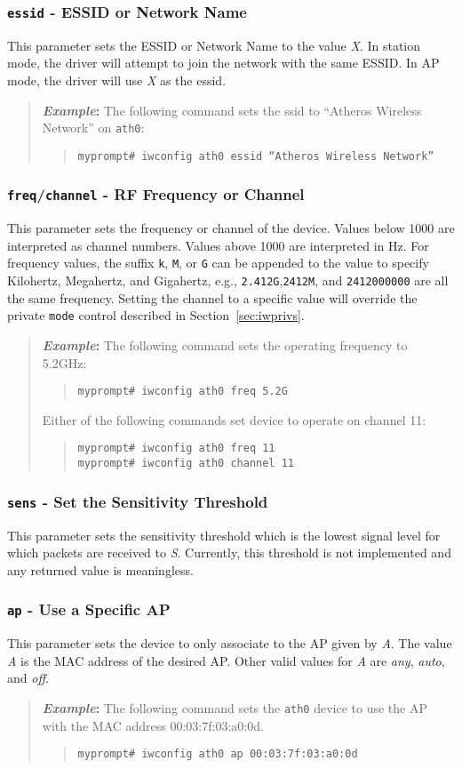 \documentclass[10pt,fullpage]{article}
\newcommand{\mytt}[1]{{\texttt{#1}}}
\newcommand{\bv}{\begin{verse}}
\newcommand{\ev}{\end{verse}}
\newcommand{\cmd}[1]{{\texttt{myprompt\# #1}}}
\newcommand{\clival}[1]{{\emph{#1}}}
\newenvironment{example}{\begin{quote}\textbf{\textit{Example}:}}{\end{quote}}
\begin{document}
\subsubsection{\mytt{essid} - ESSID or Network Name}
This parameter sets the ESSID or Network Name to the value \clival{X}.  In
station mode, the driver will attempt to join the network with the
same ESSID.  In AP mode, the driver will use \clival{X} as the essid.
\begin{example}
  The following command sets the ssid to ``Atheros Wireless
  Network'' on \mytt{ath0}:
  \bv
  \cmd{iwconfig ath0 essid ``Atheros Wireless Network''}\\
  \ev
\end{example}

\subsubsection{\mytt{freq}/\mytt{channel} - RF Frequency or Channel}
This parameter sets the frequency or channel of the device.  Values
below 1000 are interpreted as channel numbers.  Values above 1000 are
interpreted in Hz.  For frequency values, the suffix \mytt{k},
\mytt{M}, or \mytt{G} can be appended to the value to specify
Kilohertz, Megahertz, and Gigahertz, e.g., \mytt{2.412G},\mytt{2412M},
and \mytt{2412000000} are all the same frequency.  Setting the channel
to a specific value will override the private \mytt{mode} control
described in Section~\ref{sec:iwprivs}.


\begin{example}
  The following command sets the operating frequency to 5.2GHz:
  \bv
  \cmd{iwconfig ath0 freq 5.2G}
  \ev
  Either of the following commands set device to operate on channel
  11:
  \bv
  \cmd{iwconfig ath0 freq 11}\\
  \cmd{iwconfig ath0 channel 11}
  \ev
\end{example}

\subsubsection{\mytt{sens} - Set the Sensitivity Threshold}
This parameter sets the sensitivity threshold which is the lowest
signal level for which packets are received to \clival{S}.  Currently,
this threshold is not implemented and any returned value is
meaningless.

\subsubsection{\mytt{ap} - Use a Specific AP}
This parameter sets the device to only associate to the AP given by
\clival{A}.  The value \clival{A} is the MAC address of the desired
AP.  Other valid values for \clival{A} are \clival{any}, \clival{auto}, and
\clival{off}.
\begin{example}
  The following command sets the \mytt{ath0} device to use the AP with
  the MAC address 00:03:7f:03:a0:0d.
  \bv
  \cmd{iwconfig ath0 ap 00:03:7f:03:a0:0d}
  \ev
\end{example}
\end{document}
